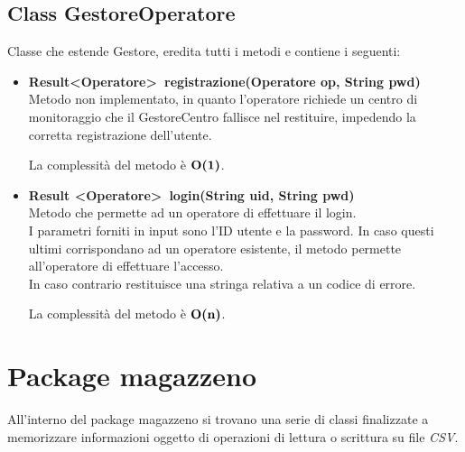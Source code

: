 \documentclass[a4paper, 12pt]{scrreprt}
\begin{document}
			\subsection{Class GestoreOperatore}
			Classe che estende Gestore, eredita tutti i metodi e contiene i seguenti:
			\begin{itemize}
				\item \textbf{Result\textless Operatore\textgreater~registrazione(Operatore op, String pwd)}
				\\Metodo non implementato, in quanto l'operatore richiede un centro di monitoraggio che il GestoreCentro fallisce nel restituire, impedendo la corretta registrazione dell'utente.

				La complessit\`a del metodo \`e $\mathbf{O}\textbf{(1)}$.

				\item \textbf{Result \textless Operatore\textgreater~login(String uid, String pwd)}
				\\Metodo che permette ad un operatore di effettuare il login.
				\\I parametri forniti in input sono l'ID utente e la password. In caso questi ultimi corrispondano ad un operatore esistente, il metodo permette all'operatore di effettuare l'accesso.
				\\In caso contrario restituisce una stringa relativa a un codice di errore.

				La complessit\`a del metodo \`e $\mathbf{O}\textbf{(n)}$.
			\end{itemize}

\pagebreak
		\section{Package magazzeno}
		All'interno del package magazzeno si trovano una serie di classi finalizzate a memorizzare informazioni oggetto di operazioni di lettura o scrittura su file \textsl{CSV}.
\end{document}
